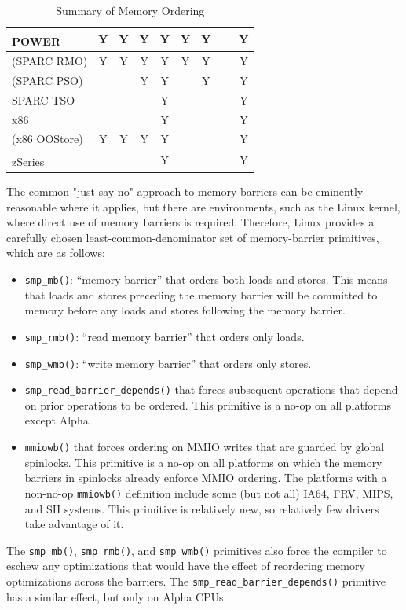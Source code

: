 \begin{table}
\begin{center}
\begin{tabular}{l|c|c|c|c|c|c|c|c}
	\hline
	POWER\textsuperscript{\texttrademark}
			& Y & Y & Y & Y   & Y & Y & ~ & Y \\
	\hline
	(SPARC RMO)	& Y & Y & Y & Y   & Y & Y & ~ & Y \\
	\hline
	(SPARC PSO)	& ~ & ~ & Y & Y   & ~ & Y & ~ & Y \\
	\hline
	SPARC TSO	& ~ & ~ & ~ & Y   & ~ & ~ & ~ & Y \\
	\hline
	x86		& ~ & ~ & ~ & Y   & ~ & ~ & ~ & Y \\
	\hline
	(x86 OOStore)	& Y & Y & Y & Y   & ~ & ~ & ~ & Y \\
	\hline
	zSeries\textsuperscript{\textregistered}
			& ~ & ~ & ~ & Y   & ~ & ~ & ~ & Y \\
\end{tabular}
\end{center}
\caption{Summary of Memory Ordering}
\label{tab:app:whymb:Summary of Memory Ordering}
\end{table}

The common "just say no" approach to memory barriers
can be eminently reasonable where it applies,
but there are environments, such as the Linux kernel, where direct
use of memory barriers is required.
Therefore,
Linux provides a carefully chosen least-common-denominator
set of memory-barrier primitives, which are as follows:
\begin{itemize}
\item	{\tt smp\_mb()}: ``memory barrier'' that orders both loads and
	stores.
	This means that loads and stores preceding the memory barrier
	will be committed to memory before any loads and stores
	following the memory barrier.
\item	{\tt smp\_rmb()}: ``read memory barrier'' that orders only loads.
\item	{\tt smp\_wmb()}: ``write memory barrier'' that orders only stores.
\item	{\tt smp\_read\_barrier\_depends()} that forces subsequent operations
	that depend on prior operations to be ordered.
	This primitive is a no-op on all platforms except Alpha.
\item	{\tt mmiowb()} that forces ordering on MMIO writes that are guarded
	by global spinlocks.
	This primitive is a no-op on all platforms on which the memory
	barriers in spinlocks already enforce MMIO ordering.
	The platforms with a non-no-op {\tt mmiowb()} definition include
	some (but not all) IA64, FRV, MIPS, and SH systems.
	This primitive is relatively new, so relatively few drivers take
	advantage of it.
\end{itemize}
The {\tt smp\_mb()}, {\tt smp\_rmb()}, and {\tt smp\_wmb()}
primitives also force
the compiler to eschew any optimizations that would have the effect
of reordering memory optimizations across the barriers.
The {\tt smp\_read\_barrier\_depends()} primitive has a similar effect, but
only on Alpha CPUs.

